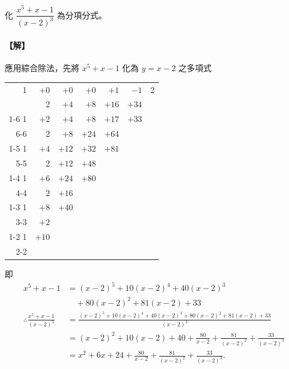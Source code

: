 \begin{example}\label{ex:7-3-8}
化 $\dfrac{x^5+x-1}{(x-2)^3}$ 為分項分式。

\paragraph{【解】}
應用綜合除法，先將 $x^5+x-1$ 化為 $y=x-2$ 之多項式
\begin{center}
\renewcommand{\arraystretch}{1.2}
\begin{tabular}{rrrrrrl}
1 & $+0$ & $+0$ & $+0$ & $+1$ & $-1$ & \multicolumn{1}{|l}{2} \\
  & 2    & $+4$ & $+8$ & $+16$ & $+34$ & \multicolumn{1}{|l}{} \\ \cline{1-6}
1 & $+2$ & $+4$ & $+8$ & $+17$ & \multicolumn{1}{|r}{$+33$} & \\ \cline{6-6}
  & 2    & $+8$ & $+24$ & $+64$ & & \\ \cline{1-5}
1 & $+4$ & $+12$ & $+32$ & \multicolumn{1}{|r}{$+81$} & & \\ \cline{5-5}
  & 2    & $+12$ & $+48$ & & & \\ \cline{1-4}
1 & $+6$ & $+24$ & \multicolumn{1}{|r}{$+80$} & & & \\ \cline{4-4}
  & 2    & $+16$ & & & & \\ \cline{1-3}
1 & $+8$ & \multicolumn{1}{|r}{$+40$} & & & & \\ \cline{3-3}
  & $+2$ & & & & & \\ \cline{1-2}
1 & \multicolumn{1}{|r}{$+10$} & & & & & \\ \cline{2-2}
\end{tabular}
\end{center}
即
\begin{align*}
  x^5+x-1 &= (x-2)^5 + 10(x-2)^4 + 40(x-2)^3 \\
  &\quad + 80(x-2)^2 + 81(x-2) + 33 \\
  \therefore \frac{x^5+x-1}{(x-2)^3} &= \frac{(x-2)^5+10(x-2)^4+40(x-2)^3+80(x-2)^2+81(x-2)+33}{(x-2)^3} \\
  &= (x-2)^2 + 10(x-2) + 40 + \frac{80}{x-2} + \frac{81}{(x-2)^2} + \frac{33}{(x-2)^3} \\
  &= x^2+6x+24 + \frac{80}{x-2} + \frac{81}{(x-2)^2} + \frac{33}{(x-2)^3}.
\end{align*}
\end{example}

